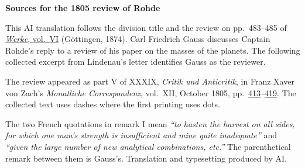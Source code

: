 \clearpage\thispagestyle{empty}
\begin{center}\textbf{Sources for the 1805 review of Rohde}\end{center}
\noindent This AI translation follows the division title and the review on pp.~483--485 of \href{https://gdz.sub.uni-goettingen.de/id/PPN236007467}{\textit{Werke}, vol.~VI} (Göttingen, 1874). Carl Friedrich Gauss discusses Captain Rohde’s reply to a review of his paper on the masses of the planets. The following collected excerpt from Lindenau’s letter identifies Gauss as the reviewer.
\par\smallskip\noindent The review appeared as part V of XXXIX, \textit{Critik und Anticritik}, in Franz Xaver von Zach’s \textit{Monatliche Correspondenz}, vol.~XII, October 1805, pp.~\href{https://api.digitale-sammlungen.de/iiif/image/v2/bsb10538604_00429/full/1500,/0/default.jpg}{413}--\href{https://api.digitale-sammlungen.de/iiif/image/v2/bsb10538604_00435/full/1500,/0/default.jpg}{419}. The collected text uses dashes where the first printing uses dots.
\par\smallskip\noindent The two French quotations in remark I mean \emph{“to hasten the harvest on all sides, for which one man’s strength is insufficient and mine quite inadequate”} and \emph{“given the large number of new analytical combinations, etc.”} The parenthetical remark between them is Gauss’s. Translation and typesetting produced by AI.
\clearpage
